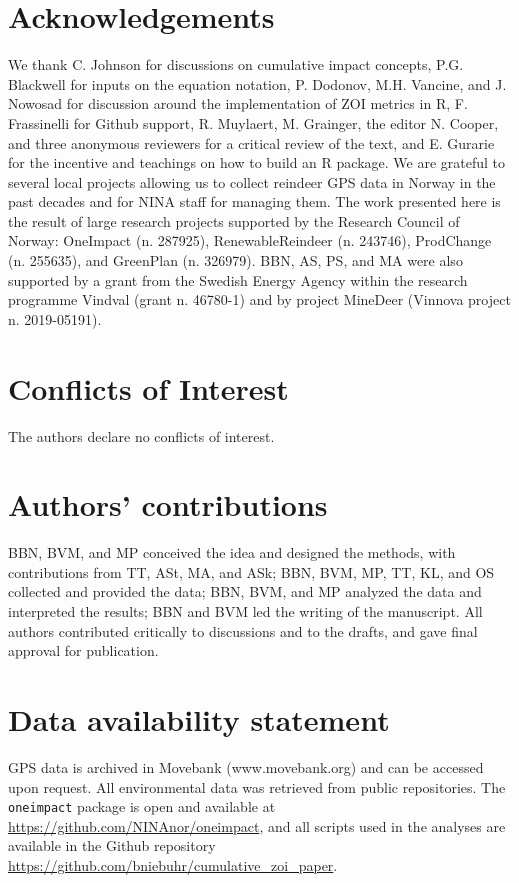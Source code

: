 \documentclass[titlepage]{article}
\begin{document}
\section*{Acknowledgements}

We thank C. Johnson for discussions on cumulative impact concepts, P.G. Blackwell for inputs on the equation notation, P. Dodonov, M.H. Vancine, and J. Nowosad for discussion around the implementation of ZOI metrics in R, F. Frassinelli for Github support, R. Muylaert, M. Grainger, the editor N. Cooper, and three anonymous reviewers for a critical review of the text, and E. Gurarie for the incentive and teachings on how to build an R package. We are grateful to several local projects allowing us to collect reindeer GPS data in Norway in the past decades and for NINA staff for managing them. The work presented here is the result of large research projects supported by the Research Council of Norway: OneImpact (n. 287925), RenewableReindeer (n. 243746), ProdChange (n. 255635), and GreenPlan (n. 326979). BBN, AS, PS, and MA were also supported by a grant from the Swedish Energy Agency within the research programme Vindval (grant n. 46780-1) and by project MineDeer (Vinnova project n. 2019-05191).

\section*{Conflicts of Interest}

The authors declare no conflicts of interest.

\section*{Authors’ contributions}

BBN, BVM, and MP conceived the idea and designed the methods, with contributions from TT, ASt, MA, and ASk; BBN, BVM, MP, TT, KL, and OS collected and provided the data; BBN, BVM, and MP analyzed the data and interpreted the results; BBN and BVM led the writing of the manuscript. All authors contributed critically to discussions and to the drafts, and gave final approval for publication.

\section*{Data availability statement}

GPS data is archived in Movebank (www.movebank.org) and can be accessed upon request. All environmental data was retrieved from public repositories. The \verb|oneimpact| package is open and available at \url{https://github.com/NINAnor/oneimpact}, and all scripts used in the analyses are available in the Github repository \url{https://github.com/bniebuhr/cumulative_zoi_paper}.
\end{document}
